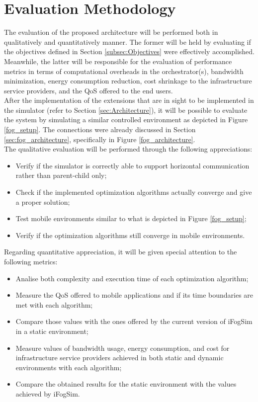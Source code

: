 \section{Evaluation Methodology}
\label{sec:Evaluation}
The evaluation of the proposed architecture will be performed both in qualitatively and quantitatively manner. The former will be held by evaluating if the objectives defined in Section \ref{subsec:Objectives} were effectively accomplished. Meanwhile, the latter will be responsible for the evaluation of performance metrics in terms of computational overheads in the orchestrator(s), bandwidth minimization, energy consumption reduction, cost shrinkage to the infrastructure service providers, and the QoS offered to the end users.\\[6pt]
After the implementation of the extensions that are in sight to be implemented in the simulator (refer to Section \ref{sec:Architecture}), it will be possible to evaluate the system by simulating a similar controlled environment as depicted in Figure \ref{fog_setup}. The connections were already discussed in Section \ref{sec:fog_architecture}, specifically in Figure \ref{fog_architecture}.\\[6pt]
The qualitative evaluation will be performed through the following appreciations:
\begin{itemize}
	\item Verify if the simulator is correctly able to support horizontal communication rather than parent-child only;
	\item Check if the implemented optimization algorithms actually converge and give a proper solution;
	\item Test mobile environments similar to what is depicted in Figure \ref{fog_setup};
	\item Verify if the optimization algorithms still converge in mobile environments.
\end{itemize}
Regarding quantitative appreciation, it will be given special attention to the following metrics:
\begin{itemize}
	\item Analise both complexity and execution time of each optimization algorithm;
	\item Measure the QoS offered to mobile applications and if its time boundaries are met with each algorithm;
	\item Compare those values with the ones offered by the current version of iFogSim in a static environment;
	\item Measure values of bandwidth usage, energy consumption, and cost for infrastructure service providers achieved in both static and dynamic environments with each algorithm;
	\item Compare the obtained results for the static environment with the values achieved by iFogSim.
\end{itemize}

